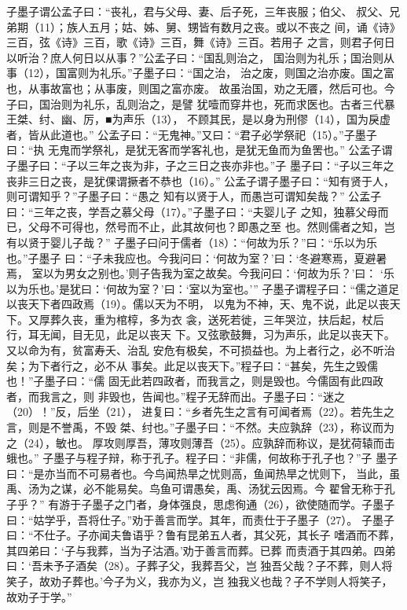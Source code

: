 \documentclass[12pt,UTF8]{ctexbook}
\begin{document}
子墨子谓公孟子曰：“丧礼，君与父母、妻、后子死，三年丧服；伯父、 
叔父、兄弟期（11）；族人五月；姑、姊、舅、甥皆有数月之丧。或以不丧之 
间，诵《诗》三百，弦《诗》三百，歌《诗》三百，舞《诗》三百。若用子 
之言，则君子何日以听治？庶人何日以从事？”公孟子曰：“国乱则治之， 
国治则为礼乐；国治则从事（12），国富则为礼乐。”子墨子曰：“国之治， 
治之废，则国之治亦废。国之富也，从事故富也；从事废，则国之富亦废。 
故虽治国，劝之无餍，然后可也。今子曰，国治则为礼乐，乱则治之，是譬 
犹噎而穿井也，死而求医也。古者三代暴王桀、纣、幽、厉，■为声乐（13）， 
不顾其民，是以身为刑僇（14），国为戾虚者，皆从此道也。” 
公孟子曰：“无鬼神。”又曰：“君子必学祭祀（15）。”子墨子曰：“执 
无鬼而学祭礼，是犹无客而学客礼也，是犹无鱼而为鱼罟也。” 
公孟子谓子墨子曰：“子以三年之丧为非，子之三日之丧亦非也。”子 
墨子曰：“子以三年之丧非三日之丧，是犹倮谓撅者不恭也（16）。” 
公孟子谓子墨子曰：“知有贤于人，则可谓知乎？”子墨子曰：“愚之 
知有以贤于人，而愚岂可谓知矣哉？” 
公孟子曰：“三年之丧，学吾之慕父母（17）。”子墨子曰：“夫婴儿子 
之知，独慕父母而已，父母不可得也，然号而不止，此其故何也？即愚之至 
也。然则儒者之知，岂有以贤于婴儿子哉？” 
子墨子曰问于儒者（18）：“何故为乐？”曰：“乐以为乐也。”子墨子 
曰：“子未我应也。今我问曰：‘何故为室？’曰：‘冬避寒焉，夏避暑焉， 
室以为男女之别也。’则子告我为室之故矣。今我问曰：‘何故为乐？’曰： 
‘乐以为乐也。’是犹曰：‘何故为室？’曰：‘室以为室也。’” 
子墨子谓程子曰：“儒之道足以丧天下者四政焉（19）。儒以天为不明， 
以鬼为不神，天、鬼不说，此足以丧天下。又厚葬久丧，重为棺椁，多为衣 
衾，送死若徙，三年哭泣，扶后起，杖后行，耳无闻，目无见，此足以丧天 
下。又弦歌鼓舞，习为声乐，此足以丧天下。又以命为有，贫富寿夭、治乱 
安危有极矣，不可损益也。为上者行之，必不听治矣；为下者行之，必不从 
事矣。此足以丧天下。”程子曰：“甚矣，先生之毁儒也！”子墨子曰：“儒 
固无此若四政者，而我言之，则是毁也。今儒固有此四政者，而我言之，则 
非毁也，告闻也。”程子无辞而出。子墨子曰：“迷之（20）！”反，后坐（21）， 
进复曰：“乡者先生之言有可闻者焉（22）。若先生之言，则是不誉禹，不毁 
桀、纣也。”子墨子曰：“不然。夫应孰辞（23），称议而为之（24），敏也。 
厚攻则厚吾，薄攻则薄吾（25）。应孰辞而称议，是犹荷辕而击蛾也。” 
子墨子与程子辩，称于孔子。程子曰：“非儒，何故称于孔子也？”子 
墨子曰：“是亦当而不可易者也。今鸟闻热旱之忧则高，鱼闻热旱之忧则下， 
当此，虽禹、汤为之谋，必不能易矣。鸟鱼可谓愚矣，禹、汤犹云因焉。今 
翟曾无称于孔子乎？” 
有游于子墨子之门者，身体强良，思虑徇通（26），欲使随而学。子墨子 
曰：“姑学乎，吾将仕子。”劝于善言而学。其年，而责仕于子墨子（27）。 
子墨子曰：“不仕子。子亦闻夫鲁语乎？鲁有昆弟五人者，其父死，其长子 
嗜酒而不葬，其四弟曰：‘子与我葬，当为子沽酒。’劝于善言而葬。已葬 
而责酒于其四弟。四弟曰：‘吾未予子酒矣（28）。子葬子父，我葬吾父，岂 
独吾父哉？子不葬，则人将笑子，故劝子葬也。’今子为义，我亦为义，岂 
独我义也哉？子不学则人将笑子，故劝子于学。” 
\end{document}
